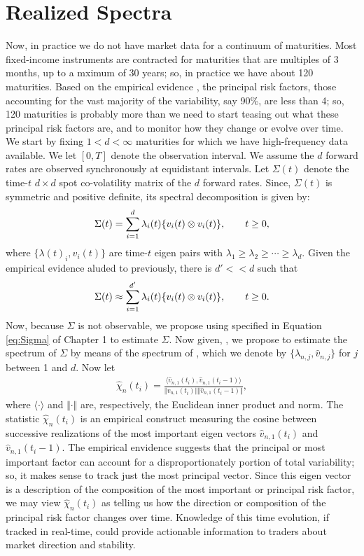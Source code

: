 \section{Realized Spectra}
Now, in practice we do not have market data for a continuum of maturities. Most fixed-income instruments are contracted for maturities that are multiples of 3 months, up to a mximum of 30 years; so, in practice we have about 120 maturities. Based on the empirical evidence \citep{Bouchaud1999, Litterman1991}, the principal risk factors, those accounting for the vast majority of the variability, say 90\%, are less than 4; so, 120 maturities is probably more than we need to start teasing out what these principal risk factors are, and to monitor how they change or evolve over time. We start by 
fixing $1 < d < \infty$ maturities for which we have high-frequency data available. 
We let $[0,T]$ denote the observation interval. We assume the $d$ forward rates are observed synchronously at equidistant intervals.  Let $\Sigma(t)$ denote the time-$t$ $d \times d$ spot co-volatility matrix of the $d$ forward rates. Since, $\Sigma(t)$ is symmetric and positive definite, its spectral decomposition is given by:
\begin{align}
  \Sigma(t) = \sum_{i = 1}^d \lambda_i(t) \{v_i(t) \otimes v_i(t)\},\qquad t \ge 0,\notag
  \label{}
\end{align}
where  $\{\lambda(t)_i , v_i(t)\}$ are time-$t$ eigen pairs with $\lambda_1 \ge \lambda_2 \ge \cdots \ge \lambda_d$.   Given the empirical evidence aluded to previously, there is $d' << d$ such that  
\begin{align}
  \Sigma(t) \approx \sum_{i = 1}^{d'} \lambda_i(t) \{v_i(t) \otimes v_i(t)\},\qquad t \ge 0. \notag
  \label{}
\end{align}
Now, because $\Sigma$ is not observable, we propose using \Svn specified in Equation \eqref{eq:Sigma} of Chapter 1 to estimate $\Sigma$. Now given, \Svn, we propose to estimate the spectrum of $\Sigma$ by means of the spectrum of \Svn, which we denote by $\{\hat{\lambda}_{n,j}, \hat{v}_{n,j}\}$ for $j$ between 1 and $d$. 
Now let 
\begin{align}
  \hat{\chi}_n (t_i) = \frac{\langle \hat{v}_{n,1}(t_i),   \hat{v}_{n,1}(t_i -1)\rangle}{\Vert \hat{v}_{n,1}(t_i) \Vert \Vert \hat{v}_{n,1}(t_i -1) \Vert},
\end{align}
where $\langle \cdot \rangle$ and $\Vert \cdot \Vert$ are, respectively, the Euclidean inner product and norm. The statistic $ \hat{\chi}_n (t_i)$ is an empirical construct measuring the cosine between successive realizations of the most important eigen vectors $\hat{v}_{n,1}(t_i)$ and  $\hat{v}_{n,1}(t_i -1)$. The empirical envidence \citep{Carmona2006} suggests that the principal or most important factor can account for a disproportionately portion of total variability; so, it makes sense to track just the most principal vector. Since this eigen vector is a description of  the composition of the most important or principal  risk factor, we may view $\hat{\chi}_n (t_i)$ as telling us how the direction or composition of the principal risk factor changes  over time. Knowledge of this time evolution, if tracked in real-time, could provide actionable information to traders about market  direction and stability.
